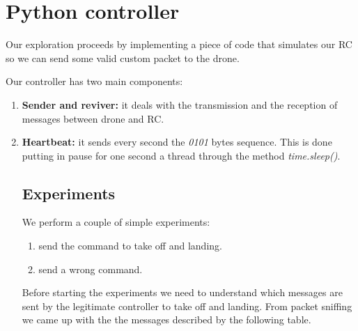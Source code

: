 \section{Python controller}
Our exploration proceeds by implementing a piece of code that simulates our RC so we can send some valid custom packet to the drone.

Our controller has two main components:
\begin{enumerate}
    \item \textbf{Sender and reviver:} it deals with the transmission and the reception of messages between drone and RC.
    \item \textbf{Heartbeat:} it sends every second the \textit{0101} bytes sequence. This is done putting in pause for one second a thread through the method \textit{time.sleep()}.

\subsection*{Experiments}
We perform a couple of simple experiments:
\begin{enumerate}
    \item send the command to take off and landing.
    \item send a wrong command.
\end{enumerate}
Before starting the experiments we need to understand which messages are sent by the legitimate controller to take off and landing. From packet sniffing we came up with the the messages described by the following table.

\begin{figure}[h]
    \begin{minipage}{.48\textwidth}
        \label{tab:messages_used}
        \vspace{.5\baselineskip}
    \end{minipage}
\end{figure}


\end{enumerate}
